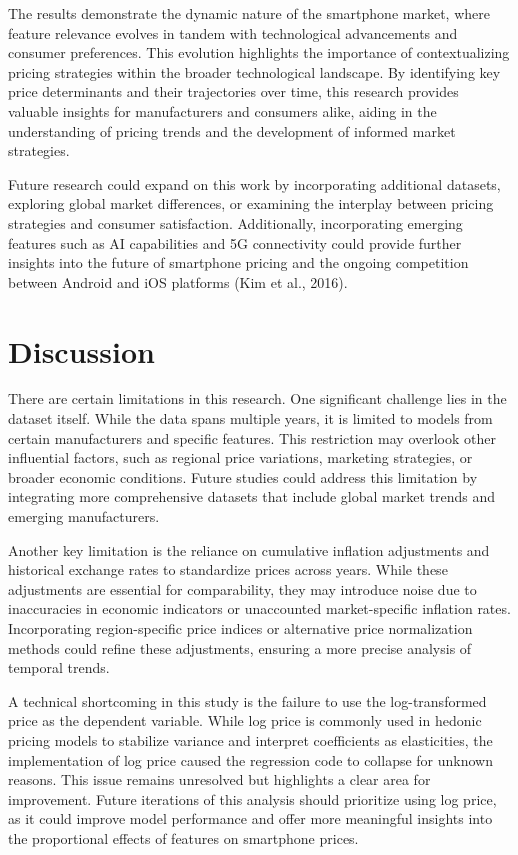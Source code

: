 \documentclass[12pt]{article}
\begin{document}
The results demonstrate the dynamic nature of the smartphone market, where feature relevance evolves in tandem with technological advancements and consumer preferences. This evolution highlights the importance of contextualizing pricing strategies within the broader technological landscape. By identifying key price determinants and their trajectories over time, this research provides valuable insights for manufacturers and consumers alike, aiding in the understanding of pricing trends and the development of informed market strategies.

Future research could expand on this work by incorporating additional datasets, exploring global market differences, or examining the interplay between pricing strategies and consumer satisfaction. Additionally, incorporating emerging features such as AI capabilities and 5G connectivity could provide further insights into the future of smartphone pricing and the ongoing competition between Android and iOS platforms (Kim et al., 2016).


\section{Discussion}
There are certain limitations in this research. One significant challenge lies in the dataset itself. While the data spans multiple years, it is limited to models from certain manufacturers and specific features. This restriction may overlook other influential factors, such as regional price variations, marketing strategies, or broader economic conditions. Future studies could address this limitation by integrating more comprehensive datasets that include global market trends and emerging manufacturers.

Another key limitation is the reliance on cumulative inflation adjustments and historical exchange rates to standardize prices across years. While these adjustments are essential for comparability, they may introduce noise due to inaccuracies in economic indicators or unaccounted market-specific inflation rates. Incorporating region-specific price indices or alternative price normalization methods could refine these adjustments, ensuring a more precise analysis of temporal trends.

A technical shortcoming in this study is the failure to use the log-transformed price as the dependent variable. While log price is commonly used in hedonic pricing models to stabilize variance and interpret coefficients as elasticities, the implementation of log price caused the regression code to collapse for unknown reasons. This issue remains unresolved but highlights a clear area for improvement. Future iterations of this analysis should prioritize using log price, as it could improve model performance and offer more meaningful insights into the proportional effects of features on smartphone prices.
\end{document}
